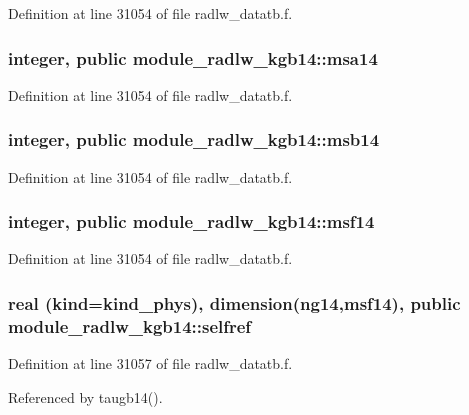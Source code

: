 Definition at line 31054 of file radlw\+\_\+datatb.\+f.

\subsubsection[{\texorpdfstring{msa14}{msa14}}]{\setlength{\rightskip}{0pt plus 5cm}integer, public module\+\_\+radlw\+\_\+kgb14\+::msa14}\hypertarget{namespacemodule__radlw__kgb14_a9357fbaa5663438f0c0062a45c99a8d4}{}\label{namespacemodule__radlw__kgb14_a9357fbaa5663438f0c0062a45c99a8d4}


Definition at line 31054 of file radlw\+\_\+datatb.\+f.

\subsubsection[{\texorpdfstring{msb14}{msb14}}]{\setlength{\rightskip}{0pt plus 5cm}integer, public module\+\_\+radlw\+\_\+kgb14\+::msb14}\hypertarget{namespacemodule__radlw__kgb14_a2d400a2aa969f2b2b6efd15555b67159}{}\label{namespacemodule__radlw__kgb14_a2d400a2aa969f2b2b6efd15555b67159}


Definition at line 31054 of file radlw\+\_\+datatb.\+f.

\subsubsection[{\texorpdfstring{msf14}{msf14}}]{\setlength{\rightskip}{0pt plus 5cm}integer, public module\+\_\+radlw\+\_\+kgb14\+::msf14}\hypertarget{namespacemodule__radlw__kgb14_a37c15d52e45cd6b36dc246a059b0c5ca}{}\label{namespacemodule__radlw__kgb14_a37c15d52e45cd6b36dc246a059b0c5ca}


Definition at line 31054 of file radlw\+\_\+datatb.\+f.

\subsubsection[{\texorpdfstring{selfref}{selfref}}]{\setlength{\rightskip}{0pt plus 5cm}real (kind=kind\+\_\+phys), dimension(ng14,{\bf msf14}), public module\+\_\+radlw\+\_\+kgb14\+::selfref}\hypertarget{namespacemodule__radlw__kgb14_a0e390a41b1c9e2ece765d65774060bca}{}\label{namespacemodule__radlw__kgb14_a0e390a41b1c9e2ece765d65774060bca}


Definition at line 31057 of file radlw\+\_\+datatb.\+f.



Referenced by taugb14().

